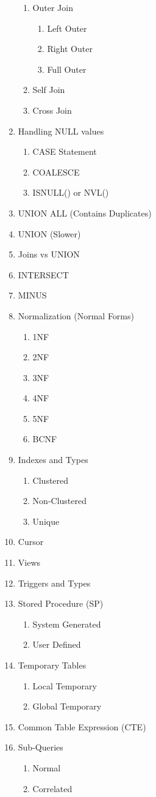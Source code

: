 \documentclass[11pt]{article}
\begin{document}
\begin{enumerate}
\begin{enumerate}
   	\item Outer Join
   	\begin{enumerate}
   		\item Left Outer
   		\item Right Outer
   		\item Full Outer 
   	\end{enumerate}
   \item Self Join
   \item Cross Join
   \end{enumerate}
    \item Handling NULL values
    \begin{enumerate}
    	\item CASE Statement
    	\item COALESCE
    	\item ISNULL() or NVL()
    \end{enumerate}
    \item UNION ALL (Contains Duplicates)
    \item UNION (Slower)
    \item Joins vs UNION
    \item INTERSECT
    \item MINUS
	\item Normalization (Normal Forms)
	\begin{enumerate}
		\item 1NF
		\item 2NF
		\item 3NF
		\item 4NF
		\item 5NF
		\item BCNF		
	\end{enumerate}
\item Indexes and Types
\begin{enumerate}
	\item Clustered
	\item Non-Clustered
	\item Unique
\end{enumerate}
\item Cursor
\item Views
\item Triggers and Types
\item Stored Procedure (SP)
\begin{enumerate}
	\item System Generated
	\item User Defined
\end{enumerate}
\item Temporary Tables
\begin{enumerate}
	\item Local Temporary
	\item Global Temporary
\end{enumerate}
\item Common Table Expression (CTE)
\item Sub-Queries
\begin{enumerate}
	\item Normal
	\item Correlated
\end{enumerate}
\end{enumerate}
\end{document}
